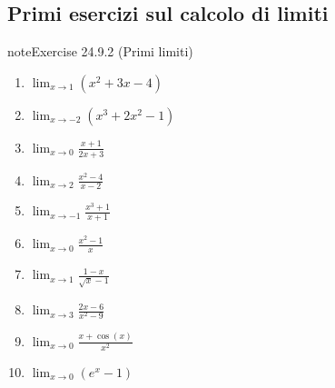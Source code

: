 \documentclass[letterpaper,10pt,italian]{jupyterBook}
\begin{document}
\subsection{Primi esercizi sul calcolo di limiti}
\label{\detokenize{ch/infinitesimal_calculus/analysis-problems:primi-esercizi-sul-calcolo-di-limiti}}\label{\detokenize{ch/infinitesimal_calculus/analysis-problems:infinitesimal-calculus-analysis-problems-elementary}} \label{exercise:ch/infinitesimal_calculus/analysis-problems-exercise-1}

\begin{sphinxadmonition}{note}{Exercise 24.9.2 (Primi limiti)}




\begin{enumerate}
%
\item {} 
\sphinxAtStartPar
\(\lim_{x \to 1} (x^2 + 3x - 4)\)

\item {} 
\sphinxAtStartPar
\(\lim_{x \to -2} (x^3 + 2x^2 - 1)\)

\item {} 
\sphinxAtStartPar
\(\lim_{x \to 0} \frac{x + 1}{2x + 3}\)

\item {} 
\sphinxAtStartPar
\(\lim_{x \to 2} \frac{x^2 - 4}{x - 2}\)

\item {} 
\sphinxAtStartPar
\(\lim_{x \to -1} \frac{x^3 + 1}{x + 1}\)

\item {} 
\sphinxAtStartPar
\(\lim_{x \to 0} \frac{x^2 - 1}{x}\)

\item {} 
\sphinxAtStartPar
\(\lim_{x \to 1} \frac{1 - x}{\sqrt{x} - 1}\)

\item {} 
\sphinxAtStartPar
\(\lim_{x \to 3} \frac{2x - 6}{x^2 - 9}\)

\item {} 
\sphinxAtStartPar
\(\lim_{x \to 0} \frac{x + \cos(x)}{x^2}\)

\item {} 
\sphinxAtStartPar
\(\lim_{x \to 0} \left( e^x - 1 \right)\)

\end{enumerate}
\end{sphinxadmonition}
\end{document}
